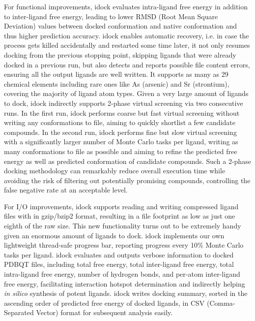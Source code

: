 \documentclass[10pt,conference,compsocconf]{../IEEEtran}
\begin{document}
For functional improvements, idock evaluates intra-ligand free energy in addition to inter-ligand free energy, leading to lower RMSD (Root Mean Square Deviation) values between docked conformation and native conformation and thus higher prediction accuracy. idock enables automatic recovery, i.e. in case the process gets killed accidentally and restarted some time later, it not only resumes docking from the previous stopping point, skipping ligands that were already docked in a previous run, but also detects and reports possible file content errors, ensuring all the output ligands are well written. It supports as many as 29 chemical elements including rare ones like As (arsenic) and Sr (strontium), covering the majority of ligand atom types. Given a very large amount of ligands to dock, idock indirectly supports 2-phase virtual screening via two consecutive runs. In the first run, idock performs coarse but fast virtual screening without writing any conformations to file, aiming to quickly shortlist a few candidate compounds. In the second run, idock performs fine but slow virtual screening with a significantly larger number of Monte Carlo tasks per ligand, writing as many conformations to file as possible and aiming to refine the predicted free energy as well as predicted conformation of candidate compounds. Such a 2-phase docking methodology can remarkably reduce overall execution time while avoiding the risk of filtering out potentially promising compounds, controlling the false negative rate at an acceptable level.

For I/O improvements, idock supports reading and writing compressed ligand files with in gzip/bzip2 format, resulting in a file footprint as low as just one eighth of the raw size. This new functionality turns out to be extremely handy given an enormous amount of ligands to dock. idock implements our own lightweight thread-safe progress bar, reporting progress every 10\% Monte Carlo tasks per ligand. idock evaluates and outputs verbose information to docked PDBQT files, including total free energy, total inter-ligand free energy, total intra-ligand free energy, number of hydrogen bonds, and per-atom inter-ligand free energy, facilitating interaction hotspot determination and indirectly helping \textit{in silico} synthesis of potent ligands. idock writes docking summary, sorted in the ascending order of predicted free energy of docked ligands, in CSV (Comma-Separated Vector) format for subsequent analysis easily.
\end{document}
